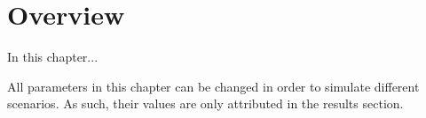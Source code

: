 \section*{Overview}


In this chapter...


All parameters in this chapter can be changed in order to simulate different scenarios. As such, their values are only attributed in the results section.